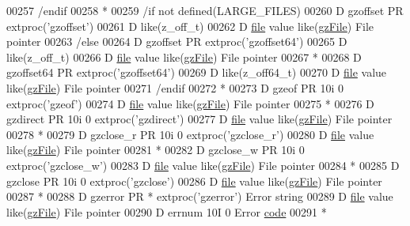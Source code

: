 \begin{DoxyCode}
00257       /endif
00258       *
00259       /if not defined(LARGE\_FILES)
00260      D gzoffset        PR                  extproc('gzoffset')
00261      D                                     like(z\_off\_t)
00262      D  \hyperlink{structfile}{file}                               value like(\hyperlink{structgz_file__s}{gzFile})                   File pointer
00263       /else
00264      D gzoffset        PR                  extproc('gzoffset64')
00265      D                                     like(z\_off\_t)
00266      D  \hyperlink{structfile}{file}                               value like(\hyperlink{structgz_file__s}{gzFile})                   File pointer
00267       *
00268      D gzoffset64      PR                  extproc('gzoffset64')
00269      D                                     like(z\_off64\_t)
00270      D  \hyperlink{structfile}{file}                               value like(\hyperlink{structgz_file__s}{gzFile})                   File pointer
00271       /endif
00272       *
00273      D gzeof           PR            10i 0 extproc('gzeof')
00274      D  \hyperlink{structfile}{file}                               value like(\hyperlink{structgz_file__s}{gzFile})                   File pointer
00275       *
00276      D gzdirect        PR            10i 0 extproc('gzdirect')
00277      D  \hyperlink{structfile}{file}                               value like(\hyperlink{structgz_file__s}{gzFile})                   File pointer
00278       *
00279      D gzclose\_r       PR            10i 0 extproc('gzclose\_r')
00280      D  \hyperlink{structfile}{file}                               value like(\hyperlink{structgz_file__s}{gzFile})                   File pointer
00281       *
00282      D gzclose\_w       PR            10i 0 extproc('gzclose\_w')
00283      D  \hyperlink{structfile}{file}                               value like(\hyperlink{structgz_file__s}{gzFile})                   File pointer
00284       *
00285      D gzclose         PR            10i 0 extproc('gzclose')
00286      D  \hyperlink{structfile}{file}                               value like(\hyperlink{structgz_file__s}{gzFile})                   File pointer
00287       *
00288      D gzerror         PR              *   extproc('gzerror')                   Error \textcolor{keywordtype}{string}
00289      D  \hyperlink{structfile}{file}                               value like(\hyperlink{structgz_file__s}{gzFile})                   File pointer
00290      D  errnum                       10I 0                                      Error 
      \hyperlink{structcode}{code}
00291       *

\end{DoxyCode}

